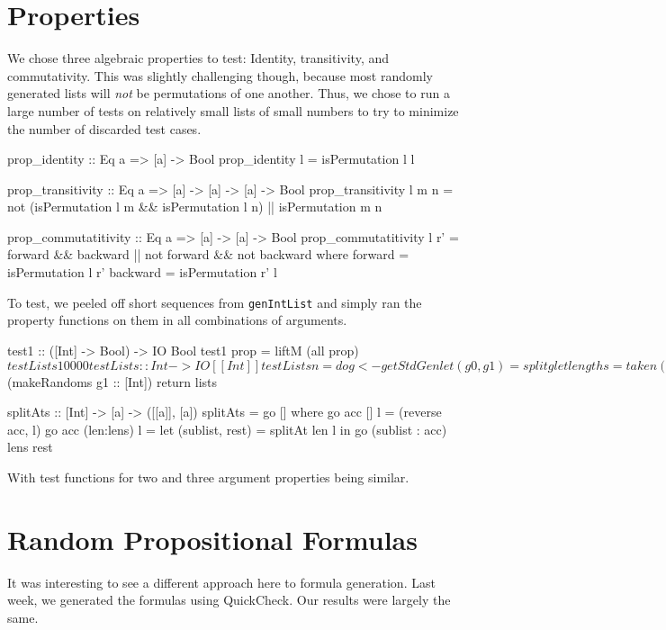 \documentclass[a4paper,10pt]{article}
\numberwithin{equation}{section}%
\begin{document}
\section{Properties}
We chose three algebraic properties to test: Identity, transitivity, and commutativity. This was slightly challenging though, because most randomly generated lists will \emph{not} be permutations of one another. Thus, we chose to run a large number of tests on relatively small lists of small numbers to try to minimize the number of discarded test cases.
\begin{code}
prop_identity :: Eq a => [a] -> Bool
prop_identity l = isPermutation l l

prop_transitivity :: Eq a => [a] -> [a] -> [a] -> Bool
prop_transitivity l m n = not (isPermutation l m && isPermutation l n) || isPermutation m n

prop_commutatitivity :: Eq a => [a] -> [a] -> Bool
prop_commutatitivity l r' = forward && backward || not forward && not backward
    where forward  = isPermutation l r'
          backward = isPermutation r' l
\end{code}
To test, we peeled off short sequences from \texttt{genIntList} and simply ran the property functions on them in all combinations of arguments.

\begin{code}
test1 :: ([Int] -> Bool) -> IO Bool
test1 prop = liftM (all prop) $ testLists 10000

testLists :: Int -> IO [[Int]]
testLists n = do
    g <- getStdGen
    let (g0, g1) = split g
    let lengths = take n (makeRandoms g0 :: [Int])
    let lists = fst . splitAts lengths $ (makeRandoms g1 :: [Int])
    return lists

splitAts :: [Int] -> [a] -> ([[a]], [a])
splitAts = go []
  where
    go acc []         l = (reverse acc, l)
    go acc (len:lens) l = let (sublist, rest) = splitAt len l
                          in go (sublist : acc) lens rest
\end{code}
With test functions for two and three argument properties being similar.

\section{Random Propositional Formulas}

It was interesting to see a different approach here to formula generation. Last week, we generated the formulas using QuickCheck. Our results were largely the same.
\end{document}
